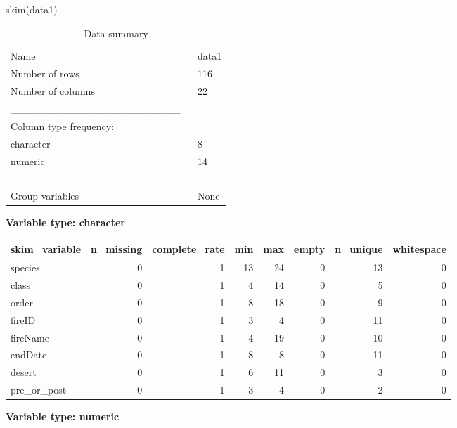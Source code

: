 \documentclass[
]{article}
\newenvironment{Shaded}{\begin{snugshade}}{\end{snugshade}}
\newcommand{\FunctionTok}[1]{\textcolor[rgb]{0.00,0.00,0.00}{#1}}
\newcommand{\NormalTok}[1]{#1}
\begin{document}
\begin{Shaded}
\begin{Highlighting}[]
\FunctionTok{skim}\NormalTok{(data1)}
\end{Highlighting}
\end{Shaded}

\begin{longtable}[]{@{}ll@{}}
\caption{Data summary}\tabularnewline
\toprule
\endhead
Name & data1 \\
Number of rows & 116 \\
Number of columns & 22 \\
\_\_\_\_\_\_\_\_\_\_\_\_\_\_\_\_\_\_\_\_\_\_\_ & \\
Column type frequency: & \\
character & 8 \\
numeric & 14 \\
\_\_\_\_\_\_\_\_\_\_\_\_\_\_\_\_\_\_\_\_\_\_\_\_ & \\
Group variables & None \\
\bottomrule
\end{longtable}

\textbf{Variable type: character}

\begin{longtable}[]{@{}lrrrrrrr@{}}
\toprule
skim\_variable & n\_missing & complete\_rate & min & max & empty &
n\_unique & whitespace \\
\midrule
\endhead
species & 0 & 1 & 13 & 24 & 0 & 13 & 0 \\
class & 0 & 1 & 4 & 14 & 0 & 5 & 0 \\
order & 0 & 1 & 8 & 18 & 0 & 9 & 0 \\
fireID & 0 & 1 & 3 & 4 & 0 & 11 & 0 \\
fireName & 0 & 1 & 4 & 19 & 0 & 10 & 0 \\
endDate & 0 & 1 & 8 & 8 & 0 & 11 & 0 \\
desert & 0 & 1 & 6 & 11 & 0 & 3 & 0 \\
pre\_or\_post & 0 & 1 & 3 & 4 & 0 & 2 & 0 \\
\bottomrule
\end{longtable}

\textbf{Variable type: numeric}
\end{document}
